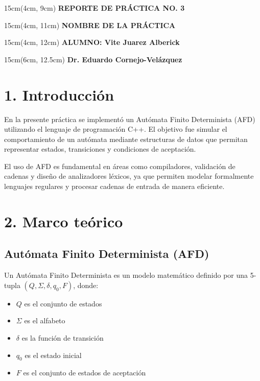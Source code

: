 \documentclass{article}
\begin{document}
\BgThispage
\-
\begin{textblock*}{15cm}(4cm, 9cm)
    {\fontsize{30pt}{16pt}\selectfont
    \textcolor{rojo}{\textbf{REPORTE DE PRÁCTICA NO. 3}}
    }
\end{textblock*}
\begin{textblock*}{15cm}(4cm, 11cm)
    {\fontsize{15pt}{16pt}\selectfont
    \textcolor{rojo}{\textbf{NOMBRE DE LA PRÁCTICA}}
    }
\end{textblock*}
\begin{textblock*}{15cm}(4cm, 12cm)
    {\fontsize{13pt}{16pt}\selectfont
    \textcolor{rojo}{\textbf{ALUMNO: Vite Juarez Alberick}}
    }
\end{textblock*}
\begin{textblock*}{15cm}(6cm, 12.5cm)
    {\fontsize{11pt}{16pt}\selectfont
    \textcolor{rojo}{\textbf{Dr. Eduardo Cornejo-Velázquez}}
    }
\end{textblock*}

\newpage

\section{1. Introducción}
En la presente práctica se implementó un Autómata Finito Determinista (AFD) utilizando el lenguaje de programación C++. El objetivo fue simular el comportamiento de un autómata mediante estructuras de datos que permitan representar estados, transiciones y condiciones de aceptación.

El uso de AFD es fundamental en áreas como compiladores, validación de cadenas y diseño de analizadores léxicos, ya que permiten modelar formalmente lenguajes regulares y procesar cadenas de entrada de manera eficiente.




\section{2. Marco teórico}

\subsection{Autómata Finito Determinista (AFD)}
Un Autómata Finito Determinista es un modelo matemático definido por una 5-tupla $(Q, \Sigma, \delta, q_0, F)$, donde:
\begin{itemize}
    \item $Q$ es el conjunto de estados
    \item $\Sigma$ es el alfabeto
    \item $\delta$ es la función de transición
    \item $q_0$ es el estado inicial
    \item $F$ es el conjunto de estados de aceptación
\end{itemize}
\end{document}

